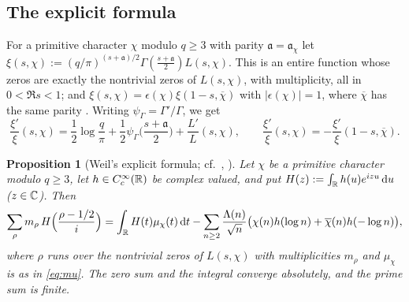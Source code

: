 \documentclass[11pt]{amsart}
\newtheorem{proposition}[theorem]{Proposition}
\theoremstyle{definition}
\theoremstyle{remark}
\numberwithin{equation}{section}
\begin{document}
\subsection{The explicit formula}
For a primitive character $\chi$ modulo $q\ge3$ with parity $\mathfrak a=\mathfrak a_\chi$ let $\xi(s,\chi):=(q/\pi)^{(s+\mathfrak a)/2}\Gamma(\frac{s+\mathfrak a}2)L(s,\chi)$. This is an entire function whose zeros are exactly the nontrivial zeros of $L(s,\chi)$, with multiplicity, all in $0<\Re s<1$; and $\xi(s,\chi)=\epsilon(\chi)\xi(1-s,\overline\chi)$ with $|\epsilon(\chi)|=1$, where $\overline\chi$ has the same parity \cite[Chs.~9, 12]{Dav}. Writing $\psi_\Gamma=\Gamma'/\Gamma$, we get
\begin{equation}\label{eqB:logder}
\frac{\xi'}\xi(s,\chi)=\frac12\log\frac q\pi+\frac12\psi_\Gamma\Big(\frac{s+\mathfrak a}2\Big)+\frac{L'}L(s,\chi),\qquad\frac{\xi'}\xi(s,\chi)=-\frac{\xi'}\xi(1-s,\overline\chi).
\end{equation}

\begin{proposition}[Weil's explicit formula; cf.\ {\cite[Thm.~5.12]{IK04}, \cite[Prop.~4.1]{HY26}}]\label{prop:weil}
Let $\chi$ be a primitive character modulo $q\ge3$, let $h\in C_c^\infty(\mathbb R)$ be complex valued, and put $H(z):=\int_\mathbb R h(u)e^{izu}\,\mathrm d u$ ($z\in\mathbb C$). Then
\[
\sum_\rho m_\rho\,H\Big(\frac{\rho-1/2}i\Big)=\int_\mathbb R H(t)\mu_\chi(t)\,\mathrm d t-\sum_{n\ge2}\frac{\Lambda(n)}{\sqrt n}\big(\chi(n)h(\log n)+\overline\chi(n)h(-\log n)\big),
\]
where $\rho$ runs over the nontrivial zeros of $L(s,\chi)$ with multiplicities $m_\rho$ and $\mu_\chi$ is as in \eqref{eq:mu}. The zero sum and the integral converge absolutely, and the prime sum is finite.
\end{proposition}
\end{document}
